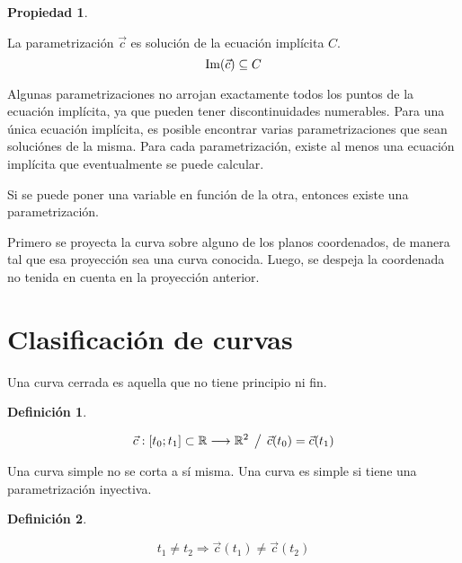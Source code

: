 \documentclass[a5paper,12pt,twoside]{book}
\newtheorem{defn}{{Definición}}[chapter]
\newtheorem{prop}{{Propiedad}}[chapter]
\begin{document}
\begin{mdframed}[style=MyFrame1]
    \begin{prop}
    \end{prop}
    La parametrización $\Vec{c}$ es solución de la ecuación implícita $C$.
    \begin{equation*}
        \operatorname{Im} (\Vec{c}) \subseteq C
    \end{equation*}
\end{mdframed}

Algunas parametrizaciones no arrojan exactamente todos los puntos de la ecuación implícita, ya que pueden tener discontinuidades numerables. Para una única ecuación implícita, es posible encontrar varias parametrizaciones que sean soluciónes de la misma. Para cada parametrización, existe al menos una ecuación implícita que eventualmente se puede calcular.


Si se puede poner una variable en función de la otra, entonces existe una parametrización.


Primero se proyecta la curva sobre alguno de los planos coordenados, de manera tal que esa proyección sea una curva conocida. Luego, se despeja la coordenada no tenida en cuenta en la proyección anterior.


\section{Clasificación de curvas}

Una curva cerrada es aquella que no tiene principio ni fin.

\begin{mdframed}[style=MyFrame1]
    \begin{defn}
    \end{defn}
    \begin{equation*}
        \Vec{c}: [t_0;t_1] \subset \mathbb{R} \longrightarrow \mathbb{R}^2 \hspace{1ex} \big/ \hspace{1ex} \Vec{c}(t_0) = \Vec{c}(t_1)
    \end{equation*}
\end{mdframed}

Una curva simple no se corta a sí misma. Una curva es simple si tiene una parametrización inyectiva.

\begin{mdframed}[style=MyFrame1]
    \begin{defn}
    \end{defn}
    \begin{equation*}
        t_1 \neq t_2 \Rightarrow \Vec{c}(t_1) \neq \Vec{c}(t_2)
    \end{equation*}
\end{mdframed}
\end{document}
